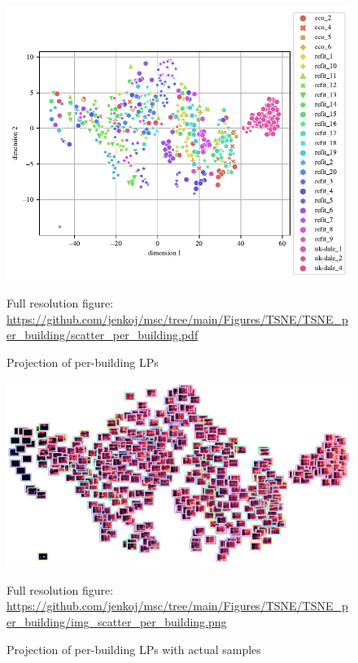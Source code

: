 \begin{figure}[H]
	\centering
	\caption{Projection of per-building LPs}
	\includegraphics[]{Figures/TSNE/TSNE_per_building/scatter_per_building.pdf}
	\label{fig:tsne_scatter_non_norm_all}
	\par
	\par\footnotesize{Full resolution figure: \url{https://github.com/jenkoj/msc/tree/main/Figures/TSNE/TSNE_per_building/scatter_per_building.pdf}}
\end{figure}

\begin{figure}[H]
	\centering
	\caption{Projection of per-building LPs with actual samples}
	\includegraphics[width=.9\textwidth]{Figures/TSNE/TSNE_per_building/img_scatter_per_building.png}
	\label{fig:tsne_pb_img_scatter_allall}
	\par
	\par\footnotesize{Full resolution figure: \url{https://github.com/jenkoj/msc/tree/main/Figures/TSNE/TSNE_per_building/img_scatter_per_building.png}}
\end{figure}


